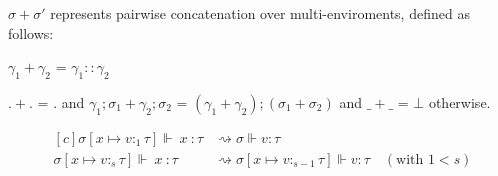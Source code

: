 $\sigma + \sigma'$ represents pairwise concatenation over multi-enviroments,
defined as follows:

\begin{definition}
  $\gamma_1 + \gamma_2$ = $\gamma_1 :: \gamma_2 $
\end{definition}

\begin{definition}
  $. + .$ = $ . $ and $\gamma_1;\sigma_1 + \gamma_2;\sigma_2$ = $(\gamma_1 +
  \gamma_2);(\sigma_1 + \sigma_2)$ and $\_ + \_$ = $\bot$ otherwise.
\end{definition}

\begin{figure}
\begin{center}
\tiny
\begin{equation*}
  \begin{aligned}[c]
    \sigma[x \mapsto v :_1 \tau] \Vdash \ x \ : \tau &\rightsquigarrow 
    \sigma \Vdash v : \tau \\
    \sigma[x \mapsto v :_{s} \tau] \Vdash \ x \ : \tau &\rightsquigarrow
    \sigma[x \mapsto v :_{s-1} \tau] \Vdash v : \tau \quad{(\text{with } 1 < s)}
    \\

\end{aligned}
\end{equation*}
\end{center}
\end{figure}

